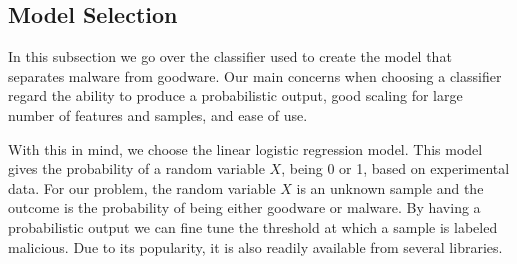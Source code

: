 {\subsection{Model Selection}

In this subsection we go over the classifier used to create the model that separates malware from goodware. Our main concerns when choosing a classifier regard the ability to produce a probabilistic output, good scaling for large number of features and samples, and ease of use.

With this in mind, we choose the linear logistic regression model. This model gives the probability of a random variable $X$, being 0 or 1, based on experimental data. For our problem, the random variable $X$ is an unknown sample and the outcome is the probability of being either goodware or malware\cite{friedman2001elements}. By having a probabilistic output we can fine tune the threshold at which a sample is labeled malicious. Due to its popularity, it is also readily available from several libraries.}